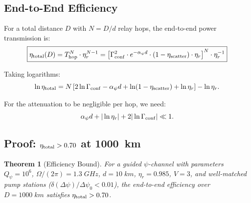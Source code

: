 \documentclass[twocolumn,superscriptaddress,prd]{revtex4-2}
\newtheorem{theorem}{Theorem}
\begin{document}
\subsection{End-to-End Efficiency}

For a total distance $D$ with $N = D/d$ relay hops, the
end-to-end power transmission is:
\begin{equation}
\boxed{
\eta_{\rm total}(D) = T_{\rm hop}^N \cdot \eta_r^{N-1}
= \left[\Gamma_{\rm conf}^2 \cdot e^{-\alpha_\psi d} \cdot (1-\eta_{\rm scatter}) \cdot \eta_r\right]^N \cdot \eta_r^{-1}
}
\label{eq:total-eff}
\end{equation}

Taking logarithms:
\begin{equation}
\ln\eta_{\rm total} = N\left[2\ln\Gamma_{\rm conf} - \alpha_\psi d + \ln(1-\eta_{\rm scatter}) + \ln\eta_r\right] - \ln\eta_r.
\end{equation}

For the attenuation to be negligible per hop, we need:
\begin{equation}
\alpha_\psi d + |\ln\eta_r| + 2|\ln\Gamma_{\rm conf}| \ll 1.
\end{equation}

\subsection{Proof: $\eta_{\rm total} > 0.70$ at 1000~km}

\begin{theorem}[Efficiency Bound]
For a guided $\psi$-channel with parameters $Q_\psi = 10^6$,
$\Omega/(2\pi) = 1.3\;\si{GHz}$, $d = 10\;\si{km}$,
$\eta_r = 0.985$, $V = 3$, and well-matched pump stations
($\delta(\Delta\psi)/\Delta\psi_0 < 0.01$), the end-to-end
efficiency over $D = 1000\;\si{km}$ satisfies
$\eta_{\rm total} > 0.70$.
\end{theorem}
\end{document}
